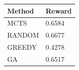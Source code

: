 \begin{tabular}{ll}
\hline
Method & Reward \\
\hline
  MCTS & 0.6584 \\
  RANDOM & 0.6677 \\
  GREEDY & 0.4278 \\
  GA & 0.6517 \\
\hline
\end{tabular}
